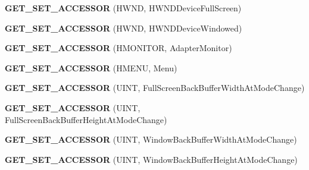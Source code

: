 \begin{DoxyCompactItemize}
\item 
\hypertarget{class_d_x_u_t_state_a8132d1d49aa7bf1fbf06c3f85d0f0658}{{\bfseries G\+E\+T\+\_\+\+S\+E\+T\+\_\+\+A\+C\+C\+E\+S\+S\+O\+R} (H\+W\+N\+D, H\+W\+N\+D\+Device\+Full\+Screen)}\label{class_d_x_u_t_state_a8132d1d49aa7bf1fbf06c3f85d0f0658}

\item 
\hypertarget{class_d_x_u_t_state_a5011c6600f15959fd9d4b7be0e44d520}{{\bfseries G\+E\+T\+\_\+\+S\+E\+T\+\_\+\+A\+C\+C\+E\+S\+S\+O\+R} (H\+W\+N\+D, H\+W\+N\+D\+Device\+Windowed)}\label{class_d_x_u_t_state_a5011c6600f15959fd9d4b7be0e44d520}

\item 
\hypertarget{class_d_x_u_t_state_a2efcc409c149447da53fa144e55ec0b2}{{\bfseries G\+E\+T\+\_\+\+S\+E\+T\+\_\+\+A\+C\+C\+E\+S\+S\+O\+R} (H\+M\+O\+N\+I\+T\+O\+R, Adapter\+Monitor)}\label{class_d_x_u_t_state_a2efcc409c149447da53fa144e55ec0b2}

\item 
\hypertarget{class_d_x_u_t_state_a4a8b78386039a9860998de7d43d2e393}{{\bfseries G\+E\+T\+\_\+\+S\+E\+T\+\_\+\+A\+C\+C\+E\+S\+S\+O\+R} (H\+M\+E\+N\+U, Menu)}\label{class_d_x_u_t_state_a4a8b78386039a9860998de7d43d2e393}

\item 
\hypertarget{class_d_x_u_t_state_a40576f264b555cf8e304dd84ffa60091}{{\bfseries G\+E\+T\+\_\+\+S\+E\+T\+\_\+\+A\+C\+C\+E\+S\+S\+O\+R} (U\+I\+N\+T, Full\+Screen\+Back\+Buffer\+Width\+At\+Mode\+Change)}\label{class_d_x_u_t_state_a40576f264b555cf8e304dd84ffa60091}

\item 
\hypertarget{class_d_x_u_t_state_ae5f41b2f4bf62828ee9225bccea71f00}{{\bfseries G\+E\+T\+\_\+\+S\+E\+T\+\_\+\+A\+C\+C\+E\+S\+S\+O\+R} (U\+I\+N\+T, Full\+Screen\+Back\+Buffer\+Height\+At\+Mode\+Change)}\label{class_d_x_u_t_state_ae5f41b2f4bf62828ee9225bccea71f00}

\item 
\hypertarget{class_d_x_u_t_state_aa9b801ff918be9e94b0c1b0c495d9988}{{\bfseries G\+E\+T\+\_\+\+S\+E\+T\+\_\+\+A\+C\+C\+E\+S\+S\+O\+R} (U\+I\+N\+T, Window\+Back\+Buffer\+Width\+At\+Mode\+Change)}\label{class_d_x_u_t_state_aa9b801ff918be9e94b0c1b0c495d9988}

\item 
\hypertarget{class_d_x_u_t_state_aa376410a98f1d763d13ab8cf678ca4e3}{{\bfseries G\+E\+T\+\_\+\+S\+E\+T\+\_\+\+A\+C\+C\+E\+S\+S\+O\+R} (U\+I\+N\+T, Window\+Back\+Buffer\+Height\+At\+Mode\+Change)}\label{class_d_x_u_t_state_aa376410a98f1d763d13ab8cf678ca4e3}


\end{DoxyCompactItemize}
